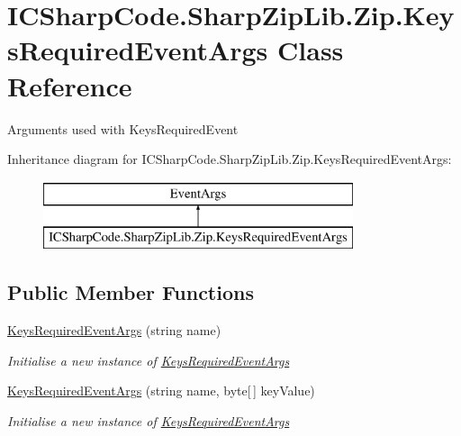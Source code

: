 \hypertarget{class_i_c_sharp_code_1_1_sharp_zip_lib_1_1_zip_1_1_keys_required_event_args}{}\section{I\+C\+Sharp\+Code.\+Sharp\+Zip\+Lib.\+Zip.\+Keys\+Required\+Event\+Args Class Reference}
\label{class_i_c_sharp_code_1_1_sharp_zip_lib_1_1_zip_1_1_keys_required_event_args}


Arguments used with Keys\+Required\+Event  


Inheritance diagram for I\+C\+Sharp\+Code.\+Sharp\+Zip\+Lib.\+Zip.\+Keys\+Required\+Event\+Args\+:\begin{figure}[H]
\begin{center}
\leavevmode
\includegraphics[height=2.000000cm]{class_i_c_sharp_code_1_1_sharp_zip_lib_1_1_zip_1_1_keys_required_event_args}
\end{center}
\end{figure}
\subsection*{Public Member Functions}
\begin{DoxyCompactItemize}
\item 
\hyperlink{class_i_c_sharp_code_1_1_sharp_zip_lib_1_1_zip_1_1_keys_required_event_args_adab155caddbe2ace5dfa7acf27c56b31}{Keys\+Required\+Event\+Args} (string name)
\begin{DoxyCompactList}\small\item\em Initialise a new instance of \hyperlink{class_i_c_sharp_code_1_1_sharp_zip_lib_1_1_zip_1_1_keys_required_event_args}{Keys\+Required\+Event\+Args} \end{DoxyCompactList}\item 
\hyperlink{class_i_c_sharp_code_1_1_sharp_zip_lib_1_1_zip_1_1_keys_required_event_args_a3d587063c33b6085a39f44ecae28add4}{Keys\+Required\+Event\+Args} (string name, byte\mbox{[}$\,$\mbox{]} key\+Value)
\begin{DoxyCompactList}\small\item\em Initialise a new instance of \hyperlink{class_i_c_sharp_code_1_1_sharp_zip_lib_1_1_zip_1_1_keys_required_event_args}{Keys\+Required\+Event\+Args} \end{DoxyCompactList}\end{DoxyCompactItemize}
